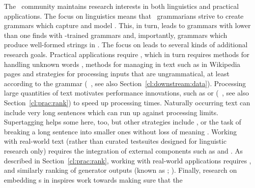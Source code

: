 \documentclass[output=paper,nonflat]{langsci/langscibook}
\begin{document}
The \delphin\ community maintains research interests in both
linguistics and practical applications. The focus on linguistics means
that \delphin\ grammarians strive to create grammars which capture
 and model . This, in turn,
leads to grammars with lower  than one finds with
-trained grammars and, importantly, grammars which produce
well-formed strings in . The focus on 
leads to several kinds of additional research goals. Practical applications
require , which in turn requires methods for handling 
unknown words
\citep[e.g.,][]{chartmapping}, methods for managing  in
text such as in Wikipedia pages \citep[e.g.,][]{FOY2010a-u} and strategies
for processing inputs that are ungrammatical, at least according to
the grammar (\eg\ \citealp{W11-2923}, see also Section~\ref{cl:downstream:data}).
Processing large quantities of text motivates performance innovations, such as  or  (\eg\ \citealp{matsuzaki2007supertag,dridan2013ubertag}, see also Section~\ref{cl:prac:rank}) to speed
up processing times. Naturally occurring text can include very long 
sentences which can run up against processing limits. Supertagging helps some here, too, but other strategies include \textit{}, or the task of breaking a long sentence into smaller ones without loss of meaning \citep{muszynska:2016:ACL-SRW}.
Working with real-world text (rather than curated testsuites designed
for linguistic research only) requires 
the integration of external components such as  
\citep[e.g.,][]{Marimon2013a-u} and  \citep[e.g.,][]{L06-1115,Sch:Usz:Fed:08}. As described in Section~\ref{cl:prac:rank}, working with real-world applications requires  \citep[e.g.,][]{Tou:Man:Fli:Oep:05}, and similarly ranking of generator outputs (known as \textit{}; \citealt[e.g.,][]{Velldal:09}). Finally, research on embedding s in  inspires work  towards making sure that the 
\end{document}
